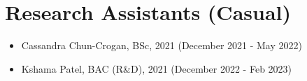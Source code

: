 \documentclass[singlecolumn,singlespace,11pt]{article}
\newcommand{\ignore}[1]{}
\begin{document}
\section*{Research Assistants (Casual)}
\begin{itemize}
\item Cassandra Chun-Crogan, BSc, 2021 (December 2021 - May 2022)
\item Kshama Patel, BAC (R\&D), 2021 (December 2022 - Feb 2023)
\end{itemize}

\ignore{
\section*{Examiner (ANU)}

\begin{itemize}

\item    In 2022, the process was centralized
\item 	 COMP8800 Zixian Cai u5937495 2020 (24 units) 
\item 	 COMP3770 Calum Snowdon u6044174 2020 (6 units)
\item 	 COMP4560 Benjamin Chamberlain Gray u6677379 2021 (12 units)
\item 	 COMP4550 Jack Hendrick de Kleuver u5740954 2021 (24 units) 
\item 	 COMP4560 Yiluo Wei u6227375 2021 (12 units)
\item 	 COMP4550 Kunal Sareen u6509424 2021 (24 units)
\item 	 COMP8755 Zicheng Liu u6924878 2021 (12 units)
\item 	 COMP4550 Alexander Horvat u6048805 2021 (24 units)
\item 	 COMP4550 Matthew Law u6699654 2021 (24 units)

\end{itemize}
}
\end{document}
